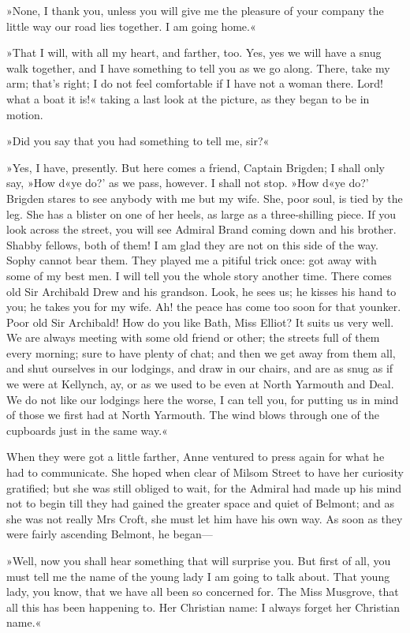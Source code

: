 »None, I thank you, unless you will give me the pleasure of your company the little way our road lies together. I am going home.«

»That I will, with all my heart, and farther, too. Yes, yes we will have a snug walk together, and I have something to tell you as we go along. There, take my arm; that's right; I do not feel comfortable if I have not a woman there. Lord! what a boat it is!« taking a last look at the picture, as they began to be in motion.

»Did you say that you had something to tell me, sir?«

»Yes, I have, presently. But here comes a friend, Captain Brigden; I shall only say, »How d«ye do?' as we pass, however. I shall not stop. »How d«ye do?' Brigden stares to see anybody with me but my wife. She, poor soul, is tied by the leg. She has a blister on one of her heels, as large as a three-shilling piece. If you look across the street, you will see Admiral Brand coming down and his brother. Shabby fellows, both of them! I am glad they are not on this side of the way. Sophy cannot bear them. They played me a pitiful trick once: got away with some of my best men. I will tell you the whole story another time. There comes old Sir Archibald Drew and his grandson. Look, he sees us; he kisses his hand to you; he takes you for my wife. Ah! the peace has come too soon for that younker. Poor old Sir Archibald! How do you like Bath, Miss Elliot? It suits us very well. We are always meeting with some old friend or other; the streets full of them every morning; sure to have plenty of chat; and then we get away from them all, and shut ourselves in our lodgings, and draw in our chairs, and are as snug as if we were at Kellynch, ay, or as we used to be even at North Yarmouth and Deal. We do not like our lodgings here the worse, I can tell you, for putting us in mind of those we first had at North Yarmouth. The wind blows through one of the cupboards just in the same way.«

When they were got a little farther, Anne ventured to press again for what he had to communicate. She hoped when clear of Milsom Street to have her curiosity gratified; but she was still obliged to wait, for the Admiral had made up his mind not to begin till they had gained the greater space and quiet of Belmont; and as she was not really Mrs Croft, she must let him have his own way. As soon as they were fairly ascending Belmont, he began—

»Well, now you shall hear something that will surprise you. But first of all, you must tell me the name of the young lady I am going to talk about. That young lady, you know, that we have all been so concerned for. The Miss Musgrove, that all this has been happening to. Her Christian name: I always forget her Christian name.«

